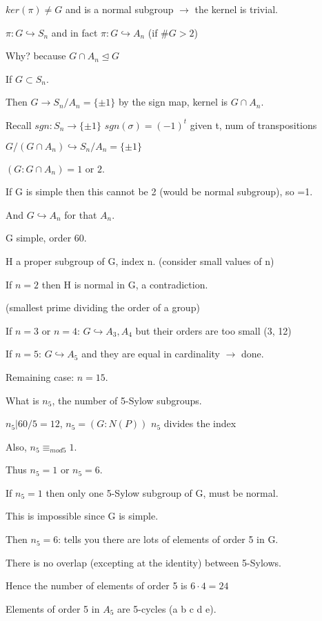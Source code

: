\documentclass[12pt]{article}
\begin{document}
$ker(\pi) \neq G$ and is a normal subgroup $\to$ the kernel is trivial.

$\pi: G \hookrightarrow S_n$ and in fact $\pi: G \hookrightarrow A_n$ (if $\#G > 2$)

\noindent
Why? because $G \cap A_n \trianglelefteq G$

If $G \subset S_n$.

Then $G \to S_n/A_n = \{\pm 1\}$ by the sign map, kernel is $G \cap A_n$.

Recall $sgn: S_n \to \{\pm 1\}$ $sgn(\sigma) = (-1)^t$ given t, num of transpositions

$G/(G \cap A_n) \hookrightarrow S_n/A_n = \{\pm 1\}$

$(G : G \cap A_n) = 1$ or $2$.

If G is simple then this cannot be 2 (would be normal subgroup), so =1.

And $G \hookrightarrow A_n$ for that $A_n$.

\noindent
G simple, order 60.

H a proper subgroup of G, index n.  (consider small values of n)

If $n = 2$ then H is normal in G, a contradiction.

(smallest prime dividing the order of a group)

If $n = 3$ or $n = 4$: $G \hookrightarrow A_3, A_4$ but their orders are too small (3, 12)

If $n = 5$: $G \hookrightarrow A_5$ and they are equal in cardinality $\to$ done.

Remaining case: $n = 15$.

What is $n_5$, the number of 5-Sylow subgroups.

$n_5 | 60\slash 5 = 12$, $n_5 = (G : N(P))$ $n_5$ divides the index

Also, $n_5 \equiv_{mod 5} 1$.

Thus $n_5 = 1$ or $n_5 = 6$.

If $n_5 = 1$ then only one 5-Sylow subgroup of G, must be normal.

This is impossible since G is simple.

Then $n_5 = 6$: tells you there are lots of elements of order 5 in G.

There is no overlap (excepting at the identity) between 5-Sylows.

Hence the number of elements of order 5 is $6 \cdot 4 = 24$

Elements of order 5 in $A_5$ are 5-cycles (a b c d e).
\end{document}
